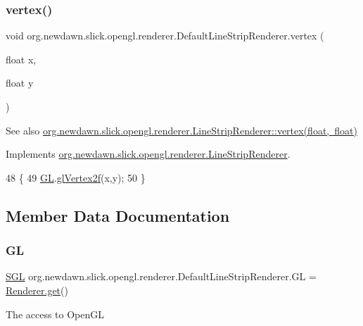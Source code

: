 \subsubsection{\texorpdfstring{vertex()}{vertex()}}
{\footnotesize\ttfamily void org.\+newdawn.\+slick.\+opengl.\+renderer.\+Default\+Line\+Strip\+Renderer.\+vertex (\begin{DoxyParamCaption}\item[{float}]{x,  }\item[{float}]{y }\end{DoxyParamCaption})\hspace{0.3cm}{\ttfamily [inline]}}

\begin{DoxySeeAlso}{See also}
\mbox{\hyperlink{interfaceorg_1_1newdawn_1_1slick_1_1opengl_1_1renderer_1_1_line_strip_renderer_a9051033674d28d26c5750155df2c5113}{org.\+newdawn.\+slick.\+opengl.\+renderer.\+Line\+Strip\+Renderer\+::vertex(float, float)}} 
\end{DoxySeeAlso}


Implements \mbox{\hyperlink{interfaceorg_1_1newdawn_1_1slick_1_1opengl_1_1renderer_1_1_line_strip_renderer_a9051033674d28d26c5750155df2c5113}{org.\+newdawn.\+slick.\+opengl.\+renderer.\+Line\+Strip\+Renderer}}.


\begin{DoxyCode}
48                                          \{
49         \mbox{\hyperlink{classorg_1_1newdawn_1_1slick_1_1opengl_1_1renderer_1_1_default_line_strip_renderer_a8c4f5b0df77bf3a446d9d570f26e4171}{GL}}.\mbox{\hyperlink{interfaceorg_1_1newdawn_1_1slick_1_1opengl_1_1renderer_1_1_s_g_l_ad9c89f8bb275f22956f7687da5ec27c5}{glVertex2f}}(x,y);
50     \}
\end{DoxyCode}


\subsection{Member Data Documentation}
\mbox{\label{classorg_1_1newdawn_1_1slick_1_1opengl_1_1renderer_1_1_default_line_strip_renderer_a8c4f5b0df77bf3a446d9d570f26e4171}} 
\subsubsection{\texorpdfstring{GL}{GL}}
{\footnotesize\ttfamily \mbox{\hyperlink{interfaceorg_1_1newdawn_1_1slick_1_1opengl_1_1renderer_1_1_s_g_l}{S\+GL}} org.\+newdawn.\+slick.\+opengl.\+renderer.\+Default\+Line\+Strip\+Renderer.\+GL = \mbox{\hyperlink{classorg_1_1newdawn_1_1slick_1_1opengl_1_1renderer_1_1_renderer_abe742c3a7dfca67c6c01821d27087308}{Renderer.\+get}}()\hspace{0.3cm}{\ttfamily [private]}}

The access to Open\+GL 